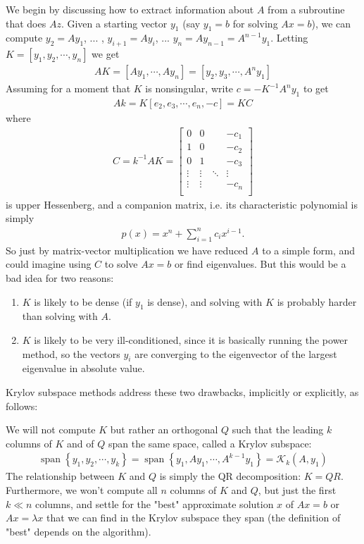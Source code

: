\documentclass[11pt]{article}
\numberwithin{equation}{section}
\begin{document}
We begin by discussing how to extract information about $A$ from a subroutine that does $Az$. Given a starting vector $y_1$ (say $y_1 = b$ for solving $Ax=b$),
we can compute $y_2 = Ay_1$, ... , $y_{i+1} = Ay_i$, ... $y_n = Ay_{n-1} = A^{n-1}y_1$.
Letting $K = [y_1,y_2,\cdots,y_n]$ we get \begin{align*}
    AK = \left[ Ay_{1},\cdots,Ay_{n} \right] = \left[ y_2, y_3, \cdots, A^n y_1 \right]
\end{align*}
Assuming for a moment that $K$ is nonsingular, write $c=-K^{-1} A^{n} y_1$ to get \begin{align*}
    Ak = K\left[ e_2, e_3, \cdots, e_n, -c \right] = KC
\end{align*}
where \begin{align*}
    C = k^{-1} A K= \left[ \begin{array}{cccc}
        0 & 0 & & -c_1 \\
        1 & 0 & & -c_2 \\
        0 & 1 & & -c_3 \\
        \vdots & \vdots & \ddots & \vdots \\
        \vdots & \vdots & & -c_n \\
    \end{array} \right]
\end{align*}
is upper Hessenberg, and a companion matrix, i.e. its characteristic polynomial is simply \begin{align*}
    p(x) = x^n + \sum_{i=1}^{n} c_i x^{i-1}.
\end{align*}
So just by matrix-vector multiplication we have reduced $A$ to a simple form, and could imagine using $C$ to solve $Ax=b$ or find eigenvalues.
But this would be a bad idea for two reasons:\begin{enumerate}
    \item $K$ is likely to be dense (if $y_1$ is dense), and solving with $K$ is probably harder than solving with $A$.
    \item $K$ is likely to be very ill-conditioned, since it is basically running the power method, so the vectors $y_i$ are converging to the eigenvector of the largest eigenvalue in absolute value.
\end{enumerate}
Krylov subspace methods address these two drawbacks, implicitly or explicitly, as follows: 

We will not compute $K$ but rather an orthogonal $Q$ such that the leading $k$ columns of $K$ and of $Q$ span the same space, called a Krylov subspace: \begin{align*}
    \operatorname{span}\left\{ y_1, y_2, \cdots, y_k \right\} = \operatorname{span}\left\{ y_1, Ay_1, \cdots, A^{k-1}y_1 \right\} = \mathcal{K}_k(A, y_1)
\end{align*}
The relationship between $K$ and $Q$ is simply the QR decomposition: $K = QR$. Furthermore, we won't compute all $n$ columns of $K$ and $Q$, 
but just the first $k \ll n$ columns, and settle for the "best" approximate solution $x$ of $Ax=b$ or $Ax = \lambda x$ that we can find in the Krylov subspace
they span (the definition of "best" depends on the algorithm).
\end{document}
